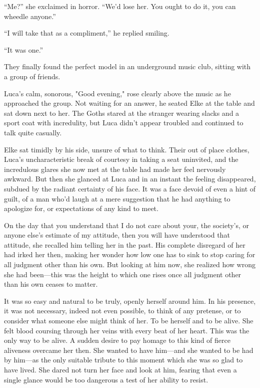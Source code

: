 ``Me?'' she exclaimed in horror. ``We'd lose her. You ought to do it, you can wheedle anyone.''

``I will take that as a compliment,'' he replied smiling.

``It was one.''

They finally found the perfect model in an underground music club, sitting with a group of friends.

Luca's calm, sonorous, "Good evening," rose clearly above the music as he approached the group. Not waiting for an answer, he seated Elke at the table and sat down next to her. The Goths stared at the stranger wearing slacks and a sport coat with incredulity, but Luca didn't appear troubled and continued to talk quite casually.

Elke sat timidly by his side, unsure of what to think. Their out of place clothes, Luca's uncharacteristic break of courtesy in taking a seat uninvited, and the incredulous glares she now met at the table had made her feel nervously awkward. But then she glanced at Luca and in an instant the feeling disappeared, subdued by the radiant certainty of his face. It was a face devoid of even a hint of guilt, of a man who'd laugh at a mere suggestion that he had anything to apologize for, or expectations of any kind to meet.

On the day that you understand that I do not care about your, the society's, or anyone else's estimate of my attitude, then you will have understood that attitude, she recalled him telling her in the past. His complete disregard of her had irked her then, making her wonder how low one has to sink to stop caring for all judgment other than his own. But looking at him now, she realized how wrong she had been---this was the height to which one rises once all judgment other than his own ceases to matter.

It was so easy and natural to be truly, openly herself around him. In his presence, it was not necessary, indeed not even possible, to think of any pretense, or to consider what someone else might think of her. To be herself and to be alive. She felt blood coursing through her veins with every beat of her heart. This was the only way to be alive. A sudden desire to pay homage to this kind of fierce aliveness overcame her then. She wanted to have him---and she wanted to be had by him---as the only suitable tribute to this moment which she was so glad to have lived. She dared not turn her face and look at him, fearing that even a single glance would be too dangerous a test of her ability to resist.

